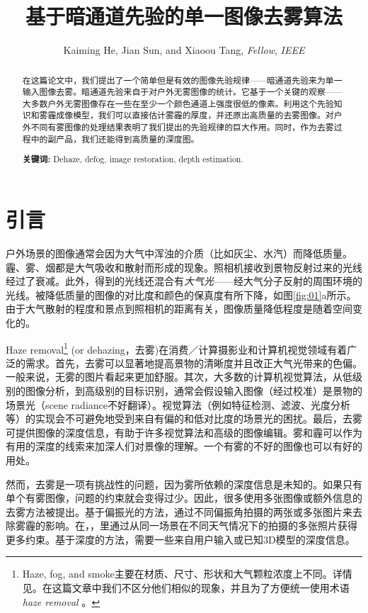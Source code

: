 \documentclass{ctexart}
\title{基于暗通道先验的单一图像去雾算法}
\author{Kaiming He, Jian Sun, and Xiaoou Tang, \emph{Fellow}, \emph{IEEE}}
\begin{document}
\maketitle

\begin{abstract}
    在这篇论文中，我们提出了一个简单但是有效的图像先验规律——暗通道先验来为单一输入图像去雾。暗通道先验来自于对户外无雾图像的统计。它基于一个关键的观察——大多数户外无雾图像存在一些在至少一个颜色通道上强度很低的像素。利用这个先验知识和雾霾成像模型，我们可以直接估计雾霾的厚度，并还原出高质量的去雾图像。对户外不同有雾图像的处理结果表明了我们提出的先验规律的巨大作用。同时，作为去雾过程中的副产品，我们还能得到高质量的深度图。

    \textbf{关键词:} Dehaze, defog, image restoration, depth estimation.
\end{abstract}

\section{引言}
户外场景的图像通常会因为大气中浑浊的介质（比如灰尘、水汽）而降低质量。霾、雾、烟都是大气吸收和散射而形成的现象。照相机接收到景物反射过来的光线经过了衰减。此外，得到的光线还混合有\emph{大气光}\cite{Koschmieder1924}——经大气分子反射的周围环境的光线。被降低质量的图像的对比度和颜色的保真度有所下降，如图\ref{fig:01}a所示。由于大气散射的程度和景点到照相机的距离有关，图像质量降低程度是随着空间变化的。\par

Haze removal\footnote{Haze, fog, and smoke主要在材质、尺寸、形状和大气颗粒浓度上不同。详情见\cite{NarasimhanNayar2002}。在这篇文章中我们不区分他们相似的现象，并且为了方便统一使用术语\emph{haze removal }。} (or dehazing，去雾)在消费／计算摄影业和计算机视觉领域有着广泛的需求。首先，去雾可以显著地提高景物的清晰度并且改正大气光带来的色偏。一般来说，无雾的图片看起来更加舒服。其次，大多数的计算机视觉算法，从低级别的图像分析，到高级别的目标识别，通常会假设输入图像（经过校准）是景物的场景光（scene radiance不好翻译）。视觉算法（例如特征检测、滤波、光度分析等）的实现会不可避免地受到来自有偏的和低对比度的场景光的困扰。最后，去雾可提供图像的深度信息，有助于许多视觉算法和高级的图像编辑。雾和霾可以作为有用的深度的线索来加深人们对景像的理解。一个有雾的不好的图像也可以有好的用处。\par

然而，去雾是一项有挑战性的问题，因为雾所依赖的深度信息是未知的。如果只有单个有雾图像，问题的约束就会变得过少。因此，很多使用多张图像或额外信息的去雾方法被提出。基于偏振光的方法\cite{SchechnerNarasimhanNayar2001}，\cite{ShwartzNamerSchechner2006}通过不同偏振角拍摄的两张或多张图片来去除雾霾的影响。在\cite{NarasimhanNayar2000}，\cite{NayarNarasimhan1999}，\cite{NarasimhanNayar2003_1}里通过从同一场景在不同天气情况下的拍摄的多张照片获得更多约束。基于深度的方法\cite{KopfNeubertChenCohenCohenOrDeussenUyttendaeleLischinski2008}，\cite{NarasimhanNayar2003_2}需要一些来自用户输入或已知3D模型的深度信息。\par
\end{document}
